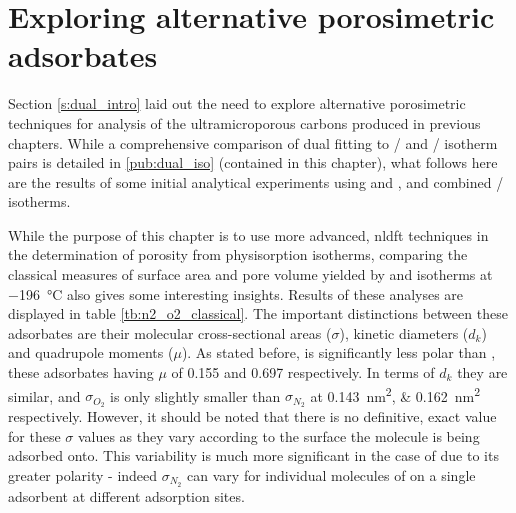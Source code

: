 \section[Exploring alternative porosimetric adsorbates]{Exploring alternative porosimetric \glspl{adsorbate}}
\label{s:dual_initial}
Section \ref{s:dual_intro} laid out the need to explore alternative porosimetric techniques for analysis of the ultramicroporous carbons produced in previous chapters. While a comprehensive comparison of dual fitting to / and / isotherm pairs is detailed in \ref{pub:dual_iso} (contained in this chapter), what follows here are the results of some initial analytical experiments using  and , and combined / isotherms.

While the purpose of this chapter is to use more advanced, \acrshort{nldft} techniques in the determination of porosity from \gls{physisorption} isotherms, comparing the classical measures of surface area and pore volume yielded by  and  isotherms at \qty{-196}{\degreeCelsius} also gives some interesting insights. Results of these analyses are displayed in table \ref{tb:n2_o2_classical}. The important distinctions between these \glspl{adsorbate} are their molecular cross-sectional areas ($\sigma$), kinetic diameters ($d_k$) and quadrupole moments ($\mu$). As stated before,  is significantly less polar than , these \glspl{adsorbate} having $\mu$ of 0.155 and 0.697 respectively.\citep{Lide2007Handbook, Poling2001Properties, Graham1998Measurement} In terms of $d_k$ they are similar, and $\sigma_{O_2}$ is only slightly smaller than $\sigma_{N_2}$ at \qtylist[list-units=single]{0.143; 0.162}{\nm\squared}  respectively. However, it should be noted that there is no definitive, exact value for these $\sigma$ values as they vary according to the surface the molecule is being adsorbed onto.\citep{kodera1959molecular, kodera1960molecular, livingston1949cross} This variability is much more significant in the case of  due to its greater polarity - indeed $\sigma_{N_2}$ can vary for individual molecules of  on a single \gls{adsorbent} at different \gls{adsorption} sites.\citep{Jagiello2020Exploiting}


